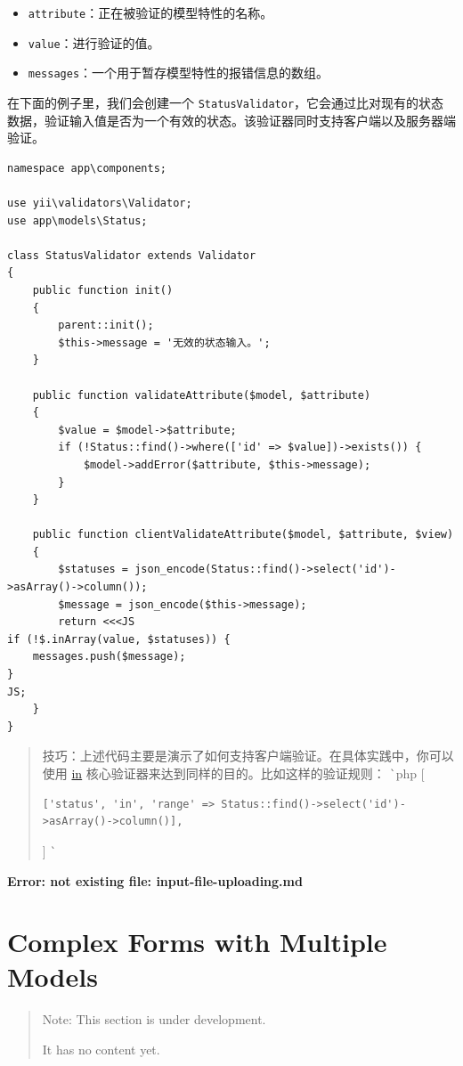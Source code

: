 \begin{itemize}
\item \lstinline|attribute|：正在被验证的模型特性的名称。
\item \lstinline|value|：进行验证的值。
\item \lstinline|messages|：一个用于暂存模型特性的报错信息的数组。
\end{itemize}
在下面的例子里，我们会创建一个 \lstinline|StatusValidator|，它会通过比对现有的状态数据，验证输入值是否为一个有效的状态。该验证器同时支持客户端以及服务器端验证。

\lstset{language=php}\begin{lstlisting}
namespace app\components;

use yii\validators\Validator;
use app\models\Status;

class StatusValidator extends Validator
{
    public function init()
    {
        parent::init();
        $this->message = '无效的状态输入。';
    }

    public function validateAttribute($model, $attribute)
    {
        $value = $model->$attribute;
        if (!Status::find()->where(['id' => $value])->exists()) {
            $model->addError($attribute, $this->message);
        }
    }

    public function clientValidateAttribute($model, $attribute, $view)
    {
        $statuses = json_encode(Status::find()->select('id')->asArray()->column());
        $message = json_encode($this->message);
        return <<<JS
if (!$.inArray(value, $statuses)) {
    messages.push($message);
}
JS;
    }
}
\end{lstlisting}
\begin{quote}技巧：上述代码主要是演示了如何支持客户端验证。在具体实践中，你可以使用 \hyperref[tutorial-core-validators.md::in]{in} 核心验证器来达到同样的目的。比如这样的验证规则：
\lstinline|`|php
[

\begin{lstlisting}
['status', 'in', 'range' => Status::find()->select('id')->asArray()->column()],
\end{lstlisting}
]
\lstinline|`|

\end{quote}


\newpage\label{input-file-uploading.md}\textbf{Error: not existing file: input-file-uploading.md}\newpage
\label{input-multiple-models.md}\section{Complex Forms with Multiple Models}
\begin{quote}Note: This section is under development.

It has no content yet.

\end{quote}


